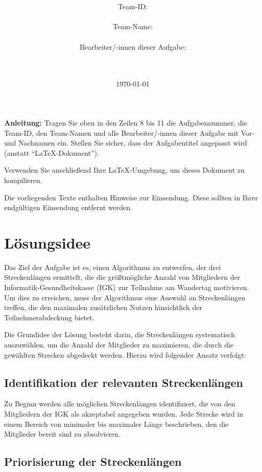 \documentclass[a4paper,10pt,ngerman]{scrartcl}
\title{\textbf{\Huge\Aufgabe}}
\author{\LARGE Team-ID: \LARGE \TeamId \\\\
	    \LARGE Team-Name: \LARGE \TeamName \\\\
	    \LARGE Bearbeiter/-innen dieser Aufgabe: \\ 
	    \LARGE \Namen\\\\}
\date{\LARGE\today}
\begin{document}
\maketitle
\tableofcontents

\vspace{0.5cm}

\textbf{Anleitung:} Tragen Sie oben in den Zeilen 8 bis 11 die Aufgabennummer, die Team-ID, den Team-Namen und alle Bearbeiter/-innen dieser Aufgabe mit Vor- und Nachnamen ein. Stellen Sie sicher, dass der Aufgabentitel angepasst wird (anstatt "`\LaTeX-Dokument"').

Verwenden Sie anschließend Ihre \LaTeX-Umgebung, um dieses Dokument zu kompilieren.

Die vorliegenden Texte enthalten Hinweise zur Einsendung. Diese sollten in Ihrer endgültigen Einsendung entfernt werden.

\section{Lösungsidee}

Das Ziel der Aufgabe ist es, einen Algorithmus zu entwerfen, der drei Streckenlängen ermittelt, die die größtmögliche Anzahl von Mitgliedern der Informatik-Gesundheitskasse (IGK) zur Teilnahme am Wandertag motivieren. Um dies zu erreichen, muss der Algorithmus eine Auswahl an Streckenlängen treffen, die den maximalen zusätzlichen Nutzen hinsichtlich der Teilnehmerabdeckung bietet.

Die Grundidee der Lösung besteht darin, die Streckenlängen systematisch auszuwählen, um die Anzahl der Mitglieder zu maximieren, die durch die gewählten Strecken abgedeckt werden. Hierzu wird folgender Ansatz verfolgt:

\subsection{Identifikation der relevanten Streckenlängen}

Zu Beginn werden alle möglichen Streckenlängen identifiziert, die von den Mitgliedern der IGK als akzeptabel angegeben wurden. Jede Strecke wird in einem Bereich von minimaler bis maximaler Länge beschrieben, den die Mitglieder bereit sind zu absolvieren.

\subsection{Priorisierung der Streckenlängen}
\end{document}
